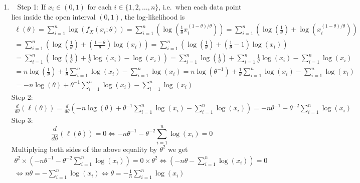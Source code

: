 \begin{Answer}
\begin{enumerate}
\item~
{\sf Step 1:} If $x_i \in (0,1)$ for each $i \in \{1,2,\ldots,n\}$, i.e.~when each data point lies inside the open interval $(0,1)$, the log-likelihood is
\begin{multline*}
\ell(\theta) = \sum_{i=1}^n \log\left(f_{X}(x_i;\theta)\right)
= \sum_{i=1}^n \left(\log\left( \frac{1}{\theta} x_i^{(1-\theta)/\theta} \right)\right)
= \sum_{i=1}^n \left(\log\left( \frac{1}{\theta}\right) + \log \left( x_i^{(1-\theta)/\theta} \right)\right)\\
= \sum_{i=1}^n \left(\log\left( \frac{1}{\theta}\right) + \left(\frac{1-\theta}{\theta}\right)\log \left( x_i \right)\right)
= \sum_{i=1}^n \left(\log\left( \frac{1}{\theta}\right) + \left(\frac{1}{\theta}-1\right)\log \left( x_i \right)\right)\\
= \sum_{i=1}^n \left(\log\left( \frac{1}{\theta}\right) + \frac{1}{\theta} \log \left( x_i \right)-\log \left( x_i \right)\right)
= \sum_{i=1}^n \log\left( \frac{1}{\theta}\right) + \sum_{i=1}^n \frac{1}{\theta} \log \left( x_i \right)- \sum_{i=1}^n \log \left( x_i \right)\\
= n \log\left( \frac{1}{\theta}\right) + \frac{1}{\theta} \sum_{i=1}^n \log \left( x_i \right)- \sum_{i=1}^n \log \left( x_i \right)
= n \log\left( \theta^{-1}\right) + \frac{1}{\theta} \sum_{i=1}^n \log \left( x_i \right)- \sum_{i=1}^n \log \left( x_i \right)\\
= -n \log\left( \theta \right) + \theta^{-1} \sum_{i=1}^n \log \left( x_i \right)- \sum_{i=1}^n \log \left( x_i \right)
\end{multline*} 
{\sf Step 2:}
\begin{multline*}
\frac{d}{d \theta} \left( \ell(\theta)\right) 
= \frac{d}{d \theta} \left( -n \log\left( \theta \right) + \theta^{-1} \sum_{i=1}^n \log \left( x_i \right)- \sum_{i=1}^n \log \left( x_i \right)\right)
= -n \theta^{-1} - \theta^{-2} \sum_{i=1}^n \log \left( x_i \right) 
\end{multline*}
{\sf Step 3:}
\[
\frac{d}{d \theta} \left( \ell(\theta)\right) = 0 \iff -n \theta^{-1} - \theta^{-2} \sum_{i=1}^n \log \left( x_i \right)=0
\]
Multiplying both sides of the above equality by $\theta^2$ we get
\begin{multline*}
\theta^2 \times \left(-n \theta^{-1} - \theta^{-2} \sum_{i=1}^n \log \left( x_i \right) \right)=0 \times \theta^2
\iff
\left(-n \theta - \sum_{i=1}^n \log \left( x_i \right) \right)=0 \\
\iff
n \theta = - \sum_{i=1}^n \log \left( x_i \right) \iff
\theta = -\frac{1}{n}\sum_{i=1}^n \log \left( x_i \right)

\end{multline*}
\end{enumerate}
\end{Answer}

